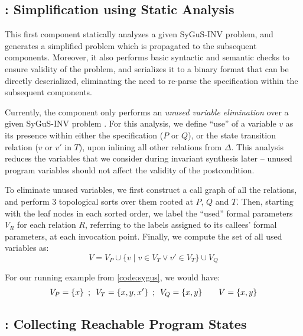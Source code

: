 \documentclass[conference]{IEEEtran}
\begin{document}
\subsection{\Process: Simplification using Static Analysis} \label{subsec:Process}

\noindent
This first component statically analyzes a given SyGuS-INV problem,
and generates a simplified problem which is propagated to the subsequent components.
Moreover, it also performs basic syntactic and semantic checks to ensure validity of the problem,
and serializes it to a binary format that can be directly deserialized,
eliminating the need to re-parse the specification within the subsequent components.

Currently, the \Process component only performs an
\emph{unused variable elimination} over a given SyGuS-INV problem \SyGuSINVQuadruplet.
For this analysis, we define ``use'' of a variable $v$ as its presence within either the specification ($P$ or $Q$),
or the state transition relation ($v$ or $v'$ in $T$), upon inlining all other relations from $\Delta$.
This analysis reduces the variables that we consider during invariant synthesis later --
unused program variables should not affect the validity of the postcondition.

To eliminate unused variables, we first construct a call graph of all the relations,
and perform 3 topological sorts over them rooted at $P$, $Q$ and $T$.
Then, starting with the leaf nodes in each sorted order, we label the ``used'' formal parameters $V_R$ for each relation $R$,
referring to the labels assigned to its callees' formal parameters, at each invocation point.
Finally, we compute the set of all used variables as:
$$
    V = V_P \cup \{ v \mid v \in V_T \vee v' \in V_T \} \cup V_Q
$$

For our running example from \cref{code:sygus}, we would have:
$$
    V_P = \{ x \} \enskip;\enskip V_T = \{ x, y, x' \} \enskip;\enskip V_Q = \{ x, y \} \qquad V = \{ x, y \}
$$

\subsection{\Record: Collecting Reachable Program States} \label{subsec:Record}
\end{document}
